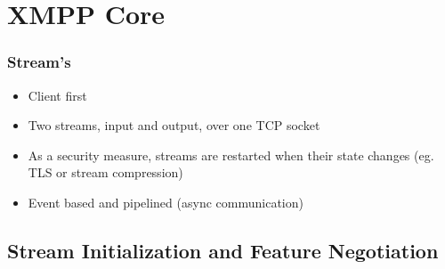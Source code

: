 \documentclass[xelatex,aspectratio=169]{beamer}
\begin{document}
\section[]{XMPP Core}
\frame{\sectionpage}

\begin{frame}
	\frametitle{Stream's}
	\begin{itemize}
		\item Client first
		\item Two streams, input and output, over one TCP socket
		\item As a security measure, streams are restarted when their state changes
			(eg. TLS or stream compression)
		\item Event based and pipelined (async communication)
	\end{itemize}
\end{frame}

\subsection[]{Stream Initialization and Feature Negotiation}
\frame{\subsectionpage}
\end{document}
